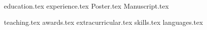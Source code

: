 \documentclass[letterpaper,11pt]{article}
\begin{document}


{education.tex}
{experience.tex}
{Poster.tex}
{Manuscript.tex}



{teaching.tex}
{awards.tex}
{extracurricular.tex}
\sidebyside
    {{skills.tex}}
    {{languages.tex}}
\end{document}
